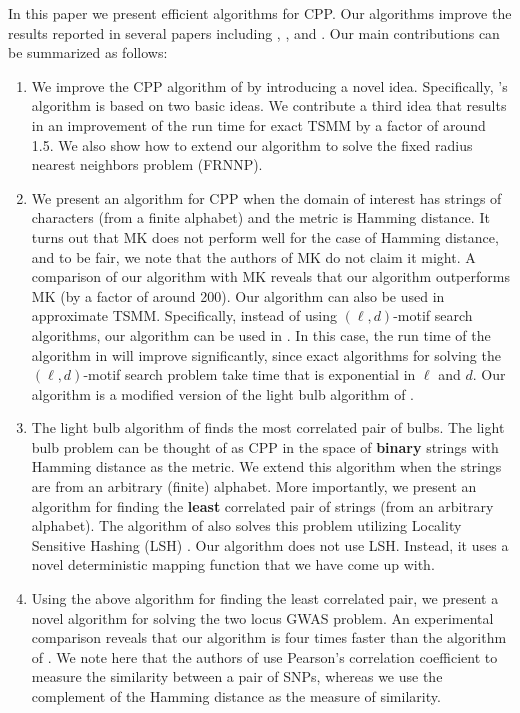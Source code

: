 \documentclass{article}
\theoremstyle{definition}
\theoremstyle{remark}
\begin{document}
In this paper we present efficient algorithms for CPP. Our algorithms improve the results reported in several papers including \cite{AEQSB09}, \cite{BES03}, and  \cite{PBK11}. Our main contributions can be summarized as follows:
\begin{enumerate}
\item We improve the CPP algorithm of \cite{AEQSB09} by introducing a novel idea. Specifically, \cite{AEQSB09}'s algorithm is based on two basic ideas. We contribute a third idea that results in an improvement of the run time for exact TSMM by a factor of around 1.5. We also show how to extend our algorithm to solve the fixed radius nearest neighbors problem (FRNNP).
\item We present an algorithm for CPP when the domain of interest has strings of characters (from a finite alphabet) and the metric is Hamming distance. It turns out that MK does not perform well for the case of Hamming distance, and to be fair, we note that the authors of MK do not claim it might. A comparison of our algorithm with MK reveals that our algorithm outperforms MK (by a factor of around 200). Our algorithm can also be used in approximate TSMM. Specifically, instead of using $(\ell,d)$-motif search algorithms, our algorithm can be used in \cite{BES03}. In this case, the run time of the algorithm in \cite{BES03} will improve significantly, since exact algorithms for solving the $(\ell,d)$-motif search problem take time that is exponential in $\ell$ and $d$. Our algorithm is a modified version of the light bulb algorithm of \cite{RSJ89}.
\item The light bulb algorithm of \cite{RSJ89} finds the most correlated pair of bulbs. The light bulb problem can be thought of as CPP in the space of {\bf binary} strings with Hamming distance as the metric. We extend this algorithm when the strings are from an arbitrary (finite) alphabet. More importantly, we present an algorithm for finding the {\bf least} correlated pair of strings (from an arbitrary alphabet). The algorithm of \cite{PBK11} also solves this problem utilizing Locality Sensitive Hashing (LSH) \cite{M02}. Our algorithm does not use LSH. Instead, it uses a novel deterministic mapping function that we have come up with.
\item Using the above algorithm for finding the least correlated pair, we present a novel algorithm for solving the two locus GWAS problem. An experimental comparison reveals that our algorithm is four times faster than the algorithm of \cite{PBK11}. We note here that the authors of \cite{PBK11} use Pearson's correlation coefficient to measure the similarity between a pair of SNPs, whereas we use the complement of the Hamming distance as the measure of similarity.
\end{enumerate}
\end{document}
